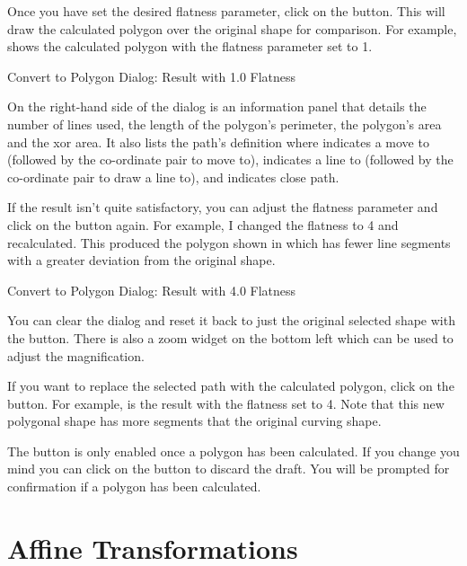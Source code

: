 
Once you have set the desired flatness parameter, click on the
 button. This will draw the calculated
polygon over the original shape for comparison. For example, 
 shows the calculated polygon with
the flatness parameter set to 1.

{}
{Convert to Polygon Dialog: Result with 1.0 Flatness}

On the right-hand side of the  dialog is an
information panel that details the number of lines used, the length
of the polygon's perimeter, the polygon's area and the \gls{xor} area.
It also lists the path's definition where  indicates a move to
(followed by the co-ordinate pair to move to),  indicates a line to
(followed by the co-ordinate pair to draw a line to), and 
indicates close path.

If the result isn't quite satisfactory, you can adjust the flatness
parameter and click on the  button again.
For example, I changed the flatness to 4 and recalculated. This
produced the polygon shown in  which
has fewer line segments with a greater deviation from the original
shape.

{}
{Convert to Polygon Dialog: Result with 4.0 Flatness}


You can clear the dialog and reset it back to just the original
selected shape with the  button.
There is also a zoom widget on the bottom left which can be used to
adjust the magnification.

If you want to replace the selected path with the
calculated polygon, click on the  button.  For example,
 is the result with the flatness set
to 4. Note that this new polygonal shape has more segments that the 
original curving shape.

\begin{information}
The  button is only enabled once a polygon has been
calculated. If you change you mind you can click on the 
button to discard the draft. You will be prompted for confirmation
if a polygon has been calculated.
\end{information}


\section{Affine Transformations}\label{sec:affinetrans}

